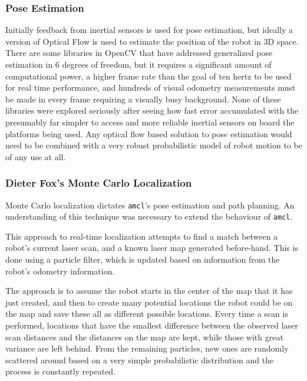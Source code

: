 \documentclass{article}[12]
\begin{document}
		\subsubsection{Pose Estimation}
	
		Initially feedback from inertial sensors is used for pose estimation, but ideally a version of Optical Flow is used to estimate the position of the robot in 3D space. There are some libraries in OpenCV that have addressed generalized pose estimation in 6 degrees of freedom, but it requires a significant amount of computational power, a higher frame rate than the goal of ten hertz to be used for real time performance, and hundreds of visual odometry measurements must be made in every frame requiring a visually busy background. None of these libraries were explored seriously after seeing how fast error accumulated with the presumably far simpler to access and more reliable inertial sensors on board the platforms being used. Any optical flow based solution to pose estimation would need to be combined with a very robust probabilistic model of robot motion to be of any use at all.
		
		\subsubsection{Dieter Fox's Monte Carlo Localization}
		
		Monte Carlo localization dictates \texttt{amcl}'s pose estimation and path planning.\cite{thrun2005probabilistic} An understanding of this technique was necessary to extend the behaviour of \texttt{amcl}.
		
		This approach to real-time localization attempts to find a match between a robot's current laser scan, and a known laser map generated before-hand. This is done using a particle filter, which is updated based on information from the robot's odometry information. 
		
		The approach is to assume the robot starts in the center of the map that it has just created, and then to create many potential locations the robot could be on the map and save these all as different possible locations. Every time a scan is performed, locations that have the smallest difference between the observed laser scan distances and the distances on the map are kept, while those with great variance are left behind. From the remaining particles, new ones are randomly scattered around based on a very simple probabilistic distribution and the process is constantly repeated. 
		
\end{document}
